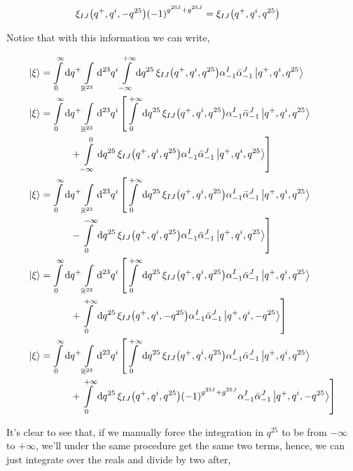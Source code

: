 \begin{align*}
    \xi_{IJ}\qty(q^+,q^i,-q^{25})\qty(-1)^{g^{25I}+g^{25J}}&=\xi_{IJ}\qty(q^+,q^i,q^{25})
\end{align*}

Notice that with this information we can write,

\begin{align*}
    \ket{\xi}&=\int\limits_0^\infty\dd{q^+}\int\limits_{\mathbb R^{23}}\dd[23]{q^i}\int\limits_{-\infty}^{+\infty}\dd{q^{25}}\xi_{IJ}\qty(q^+,q^i,q^{25})\alpha^I_{-1}{\bar\alpha}^J_{-1}\ket{q^+,q^i,q^{25}}\\
    \ket{\xi}&=\int\limits_0^\infty\dd{q^+}\int\limits_{\mathbb R^{23}}\dd[23]{q^i}\left[\int\limits_{0}^{+\infty}\dd{q^{25}}\xi_{IJ}\qty(q^+,q^i,q^{25})\alpha^I_{-1}{\bar\alpha}^J_{-1}\ket{q^+,q^i,q^{25}}\right.\\
    &\quad\quad\quad\left.+\int\limits_{-\infty}^{0}\dd{q^{25}}\xi_{IJ}\qty(q^+,q^i,q^{25})\alpha^I_{-1}{\bar\alpha}^J_{-1}\ket{q^+,q^i,q^{25}}\right]\\
    \ket{\xi}&=\int\limits_0^\infty\dd{q^+}\int\limits_{\mathbb R^{23}}\dd[23]{q^i}\left[\int\limits_{0}^{+\infty}\dd{q^{25}}\xi_{IJ}\qty(q^+,q^i,q^{25})\alpha^I_{-1}{\bar\alpha}^J_{-1}\ket{q^+,q^i,q^{25}}\right.\\
    &\quad\quad\quad\left.-\int\limits_{0}^{-\infty}\dd{q^{25}}\xi_{IJ}\qty(q^+,q^i,q^{25})\alpha^I_{-1}{\bar\alpha}^J_{-1}\ket{q^+,q^i,q^{25}}\right]\\
    \ket{\xi}&=\int\limits_0^\infty\dd{q^+}\int\limits_{\mathbb R^{23}}\dd[23]{q^i}\left[\int\limits_{0}^{+\infty}\dd{q^{25}}\xi_{IJ}\qty(q^+,q^i,q^{25})\alpha^I_{-1}{\bar\alpha}^J_{-1}\ket{q^+,q^i,q^{25}}\right.\\
    &\quad\quad\quad\left.+\int\limits_{0}^{+\infty}\dd{q^{25}}\xi_{IJ}\qty(q^+,q^i,-q^{25})\alpha^I_{-1}{\bar\alpha}^J_{-1}\ket{q^+,q^i,-q^{25}}\right]\\
    \ket{\xi}&=\int\limits_0^\infty\dd{q^+}\int\limits_{\mathbb R^{23}}\dd[23]{q^i}\left[\int\limits_{0}^{+\infty}\dd{q^{25}}\xi_{IJ}\qty(q^+,q^i,q^{25})\alpha^I_{-1}{\bar\alpha}^J_{-1}\ket{q^+,q^i,q^{25}}\right.\\
    &\quad\quad\quad\left.+\int\limits_{0}^{+\infty}\dd{q^{25}}\xi_{IJ}\qty(q^+,q^i,q^{25})\qty(-1)^{g^{25I}+g^{25J}}\alpha^I_{-1}{\bar\alpha}^J_{-1}\ket{q^+,q^i,-q^{25}}\right]
\end{align*}

It's clear to see that, if we manually force the integration in $q^{25}$ to be from $-\infty$ to $+\infty$, we'll under the same procedure get 
the same two terms, hence, we can just integrate over the reals and divide by two after,

